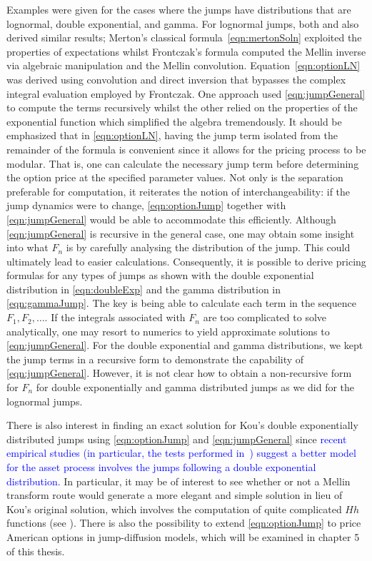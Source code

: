 Examples were given for the cases where the jumps have distributions that are lognormal, double exponential, and gamma. For lognormal jumps, both \cite{Merton1976} and \cite{Frontczak2013} also derived similar results; Merton's classical formula~\eqref{eqn:mertonSoln} exploited the properties of expectations whilst Frontczak's formula computed the Mellin inverse via algebraic manipulation and the Mellin convolution. Equation~\eqref{eqn:optionLN} was derived using convolution and direct inversion that bypasses the complex integral evaluation employed by Frontczak. One approach used \eqref{eqn:jumpGeneral} to compute the terms recursively whilst the other relied on the properties of the exponential function which simplified the algebra tremendously. It should be emphasized that in \eqref{eqn:optionLN}, having the jump term isolated from the remainder of the formula is convenient since it allows for the pricing process to be modular. That is, one can calculate the necessary jump term before determining the option price at the specified parameter values. Not only is the separation preferable for computation, it reiterates the notion of interchangeability: if the jump dynamics were to change, \eqref{eqn:optionJump} together with \eqref{eqn:jumpGeneral} would be able to accommodate this efficiently. %
Although \eqref{eqn:jumpGeneral} is recursive in the general case, one may obtain some insight into what $F_n$ is by carefully analysing the distribution of the jump. This could ultimately lead to easier calculations. Consequently, it is possible to derive pricing formulas for any types of jumps as shown with the double exponential distribution in \eqref{eqn:doubleExp} and the gamma distribution in \eqref{eqn:gammaJump}. The key is being able to calculate each term in the sequence $F_1, F_2, \ldots$. If the integrals associated with $F_n$ are too complicated to solve analytically, one may resort to numerics to yield approximate solutions to \eqref{eqn:jumpGeneral}. For the double exponential and gamma distributions, we kept the jump terms in a recursive form to demonstrate the capability of \eqref{eqn:jumpGeneral}. However, it is not clear how to obtain a non-recursive form for $F_n$ for double exponentially and gamma distributed jumps as we did for the lognormal jumps.

There is also interest in finding an exact solution for Kou's double exponentially distributed jumps \cite{Kou2002, Kou2004} using \eqref{eqn:optionJump} and \eqref{eqn:jumpGeneral} since \textcolor{blue}{recent empirical studies (in particular, the tests performed in~\cite{Ramezani1998}) suggest a better model for the asset process involves the jumps following a double exponential distribution.} In particular, it may be of interest to see whether or not a Mellin transform route would generate a more elegant and simple solution in lieu of Kou's original solution, which involves the computation of quite complicated $Hh$ functions (see \cite[pp. 691]{Abramowitz1972}). There is also the possibility to extend \eqref{eqn:optionJump} to price American options in jump-diffusion models, which will be examined in chapter 5 of this thesis.
	
